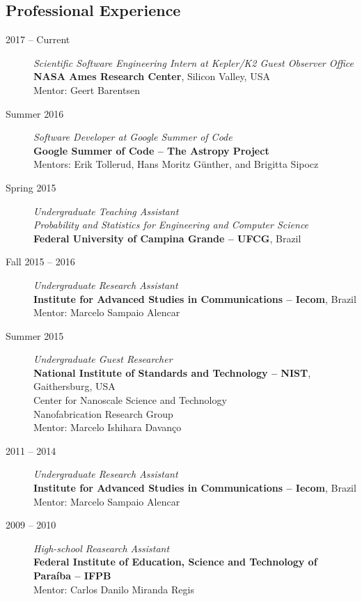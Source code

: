 \documentclass[10pt]{article}
\begin{document}
\begin{titlepage}
\section{Professional Experience}
\begin{description}
\item[2017 -- Current] \emph{Scientific Software Engineering Intern at Kepler/K2 Guest Observer Office}
\\\textbf{NASA Ames Research Center}, Silicon Valley, USA
\\Mentor: Geert Barentsen
\item[Summer 2016] \emph{Software Developer at Google Summer of Code}
\\\textbf{Google Summer of Code -- The Astropy Project}
\\Mentors: Erik Tollerud, Hans Moritz G\"unther, and Brigitta Sipocz
\item[Spring 2015] \emph{Undergraduate Teaching Assistant}
\\\emph{Probability and Statistics for Engineering and Computer Science}
\\\textbf{Federal University of Campina Grande -- UFCG}, Brazil
\item[Fall 2015 -- 2016] \emph{Undergraduate Research Assistant}
\\\textbf{Institute for Advanced Studies in Communications -- Iecom}, Brazil
\\Mentor: Marcelo Sampaio Alencar
\item[Summer 2015] \emph{Undergraduate Guest Researcher}
\\\textbf{National Institute of Standards and Technology -- NIST}, Gaithersburg, USA
\\Center for Nanoscale Science and Technology
\\Nanofabrication Research Group
\\Mentor: Marcelo Ishihara Davan\c co
\item[2011 -- 2014] \emph{Undergraduate Research Assistant}
\\\textbf{Institute for Advanced Studies in Communications -- Iecom}, Brazil
\\Mentor: Marcelo Sampaio Alencar
\item[2009 -- 2010] \emph{High-school Reasearch Assistant}
\\\textbf{Federal Institute of Education, Science and Technology of Para\'iba -- IFPB}
\\Mentor: Carlos Danilo Miranda Regis
\end{description}


\end{titlepage}
\end{document}

